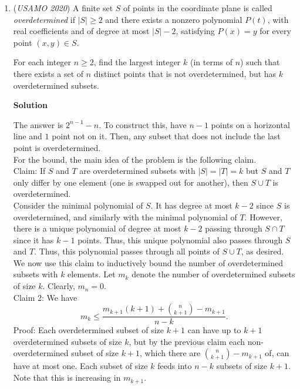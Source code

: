 \begin{enumerate}
 


 


	\item (\textit{USAMO 2020}) A finite set $S$ of points in the coordinate plane is called \textit{overdetermined} if $|S| \ge 2$ and there exists a nonzero polynomial $P(t)$, with real coefficients and of degree at most $|S| - 2$, satisfying $P(x) = y$ for every point $(x, y) \in S$.


 For each integer $n \ge 2$, find the largest integer $k$ (in terms of $n$) such that there exists a set of $n$ distinct points that is not overdetermined, but has $k$ overdetermined subsets.


 



\textbf{Solution}

The answer is $2^{n-1}-n$. To construct this, have $n-1$ points on a horizontal line and $1$ point not on it. Then, any subset that does not include the last point is overdetermined.\\

 For the bound, the main idea of the problem is the following claim.\\

 Claim: If $S$ and $T$ are overdetermined subsets with $|S|=|T|=k$ but $S$ and $T$ only differ by one element (one is swapped out for another), then $S\cup T$ is overdetermined.\\

 Consider the minimal polynomial of $S$. It has degree at most $k-2$ since $S$ is overdetermined, and similarly with the minimal polynomial of $T$. However, there is a unique polynomial of degree at most $k-2$ passing through $S\cap T$ since it has $k-1$ points. Thus, this unique polynomial also passes through $S$ and $T$. Thus, this polynomial passes through all points of $S\cup T$, as desired.\\

 We now use this claim to inductively bound the number of overdetermined subsets with $k$ elements. Let $m_k$ denote the number of overdetermined subsets of size $k$. Clearly, $m_n=0$.\\

 Claim 2: We have 
 \[m_k\leq \frac{m_{k+1}(k+1)+{n\choose k+1}-m_{k+1}}{n-k}.\] Proof: Each overdetermined subset of size $k+1$ can have up to $k+1$ overdetermined subsets of size $k$, but by the previous claim each non-overdetermined subset of size $k+1$, which there are ${n\choose k+1}-m_{k+1}$ of, can have at most one. Each subset of size $k$ feeds into $n-k$ subsets of size $k+1$. Note that this is increasing in $m_{k+1}$.\\


\end{enumerate}
